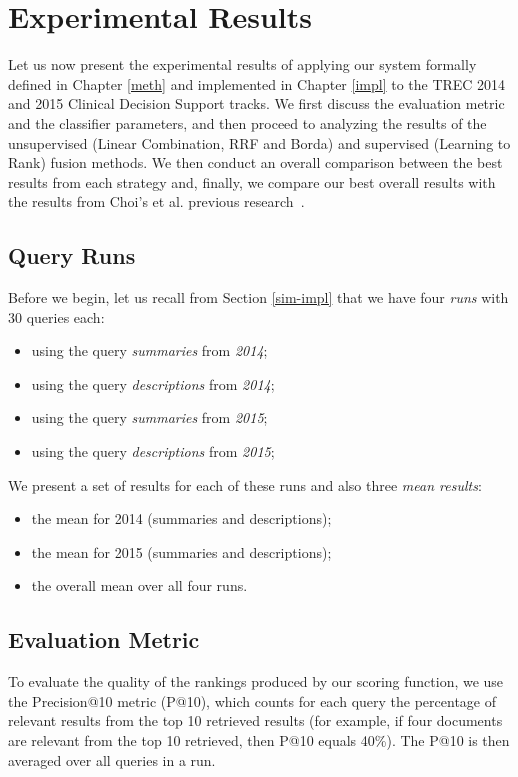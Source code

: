 \chapter{Experimental Results}\label{exp}

Let us now present the experimental results of applying our system formally defined in Chapter \ref{meth} and implemented in Chapter
\ref{impl}
to the TREC 2014 and 2015 Clinical Decision Support tracks.
We first discuss the evaluation metric and the classifier parameters,
and then proceed to analyzing
the results of the unsupervised (Linear Combination, RRF and Borda)
and supervised (Learning to Rank) fusion methods. We then conduct an overall comparison between the best results from each strategy
and, finally, we compare our best overall results with the results from Choi's et al. previous research~\cite{choi}.

\section{Query Runs}\label{runs} Before we begin, let us recall from Section \ref{sim-impl} that we have four \emph{runs} with 30 queries each:
\begin{itemize}
 \item using the query \emph{summaries} from \emph{2014};
 \item using the query \emph{descriptions} from \emph{2014};
 \item using the query \emph{summaries} from \emph{2015};
 \item using the query \emph{descriptions} from \emph{2015};
\end{itemize}

We present a set of results for each of these runs and also three \emph{mean results}:
\begin{itemize}
 \item the mean for 2014 (summaries and descriptions);
 \item the mean for 2015 (summaries and descriptions);
 \item the overall mean over all four runs.
\end{itemize}

\section{Evaluation Metric}
To evaluate the quality of the rankings produced by our scoring function, we use the Precision@10 metric (P@10), which counts for each query
the percentage of
relevant results from the top 10 retrieved results (for example, if four documents are relevant from the top 10 retrieved,
then P@10 equals 40\%). The P@10 is then averaged over all queries in a run.

